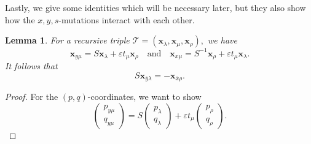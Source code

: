 \documentclass[11pt, reqno]{amsart}
\newtheorem{lemma}[thm]{Lemma}
\theoremstyle{remark}
\numberwithin{equation}{subsection}
\numberwithin{figure}{section}
\theoremstyle{customremark}
\newcommand{\Tt}{\mathcal{T}}
\newcommand{\ovx}{{\ov{x}}}
\newcommand{\ovy}{{\ov{y}}}
\newcommand{\ov}{\overline}
\newcommand{\la}{{\lambda}}
\newcommand{\eps}{\varepsilon}
\begin{document}
Lastly, we give some identities which will be necessary later, but they also show how the $x,y,s$-mutations interact with each other. 
\begin{lemma} \label{lem:identS}
    For a recursive triple $\Tt=(\bm{x}_\la,\bm{x}_\mu,\bm{x}_\rho),$ we have
    \[ \bm{x}_{y\mu}=S\bm{x}_\la+\eps t_\mu \bm{x}_\rho \quad \text{and} \quad 
\bm{x}_{x\mu}=S^{-1}\bm{x}_\rho+\eps t_\mu \bm{x}_\la.\]
It follows that
\[ S\bm{x}_{\ovy\la}=-\bm{x}_{\ovx\rho}.\]
\end{lemma}
\begin{proof}
For the $(p,q)$-coordinates, we want to show 
\begin{equation*}
\begin{pmatrix} p_{y\mu} \\ q_{y\mu} \end{pmatrix} 
= S\begin{pmatrix} p_\lambda \\ q_\lambda \end{pmatrix} 
+ \varepsilon t_\mu \begin{pmatrix} p_\rho \\ q_\rho \end{pmatrix}.
\end{equation*}


\end{proof}
\end{document}
